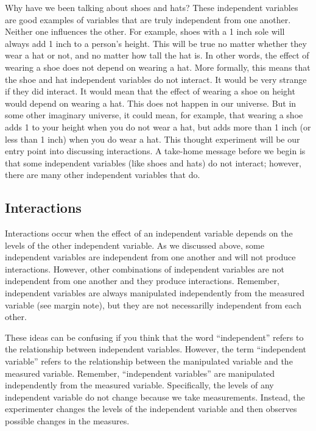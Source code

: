 Why have we been talking about shoes and hats? These independent
variables are good examples of variables that are truly independent from
one another. Neither one influences the other. For example, shoes with a
1 inch sole will always add 1 inch to a person's height. This will be
true no matter whether they wear a hat or not, and no matter how tall
the hat is. In other words, the effect of wearing a shoe does not depend
on wearing a hat. More formally, this means that the shoe and hat
independent variables do not interact. It would be very strange if they
did interact. It would mean that the effect of wearing a shoe on height
would depend on wearing a hat. This does not happen in our universe. But
in some other imaginary universe, it could mean, for example, that
wearing a shoe adds 1 to your height when you do not wear a hat, but
adds more than 1 inch (or less than 1 inch) when you do wear a hat. This
thought experiment will be our entry point into discussing interactions.
A take-home message before we begin is that some independent variables
(like shoes and hats) do not interact; however, there are many other
independent variables that do.

\subsection{Interactions}\label{interactions}

Interactions occur when the effect of an independent variable depends on
the levels of the other independent variable. As we discussed above,
some independent variables are independent from one another and will not
produce interactions. However, other combinations of independent
variables are not independent from one another and they produce
interactions. Remember, independent variables are always manipulated
independently from the measured variable (see margin note), but they are
not necessarilly independent from each other.

\begin{marginfigure}
These ideas can be confusing if you think that the word ``independent''
refers to the relationship between independent variables. However, the
term ``independent variable'' refers to the relationship between the
manipulated variable and the measured variable. Remember, ``independent
variables'' are manipulated independently from the measured variable.
Specifically, the levels of any independent variable do not change
because we take measurements. Instead, the experimenter changes the
levels of the independent variable and then observes possible changes in
the measures.
\end{marginfigure}

